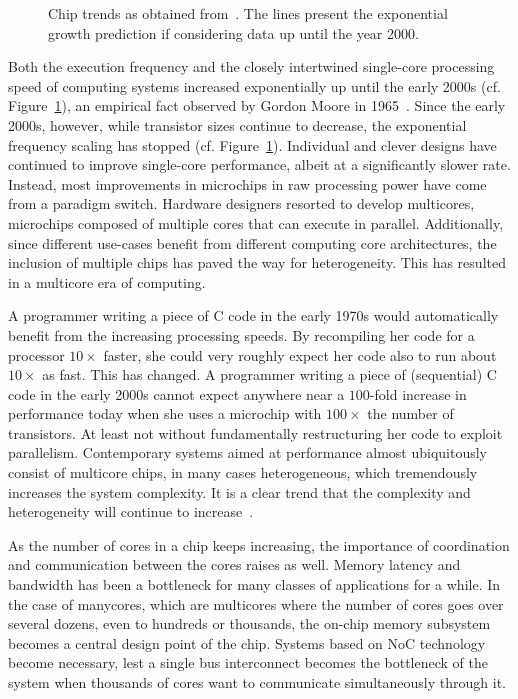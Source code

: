 \begin{figure}[h]
	\centering
   \resizebox{0.9\textwidth}{!}{}
   \caption{Chip trends as obtained from~\cite{microprocessordata}. The lines present the exponential growth prediction if considering data up until the year 2000.}
	\label{fig:multicore_era}
\end{figure}


Both the execution frequency and the closely intertwined single-core processing speed of computing systems increased exponentially up until the early 2000s (cf. Figure~\ref{fig:multicore_era}), an empirical fact observed by Gordon Moore in 1965~\cite{moore}.
Since the early 2000s, however, while transistor sizes continue to decrease, the exponential frequency scaling has stopped (cf. Figure~\ref{fig:multicore_era}).
Individual and clever designs have continued to improve single-core performance, albeit at a significantly slower rate.
Instead, most improvements in microchips in raw processing power have come from a paradigm switch.
Hardware designers resorted to develop multicores, microchips composed of multiple cores that can execute in parallel.
Additionally, since different use-cases benefit from different computing core architectures, the inclusion of multiple chips has paved the way for heterogeneity.
This has resulted in a multicore era of computing.

A programmer writing a piece of C code in the early 1970s would automatically benefit from the increasing processing speeds.
By recompiling her code for a processor $10 \times$ faster, she could very roughly expect her code also to run about $10 \times$ as fast. %
This has changed. A programmer writing a piece of (sequential) C code in the early 2000s cannot expect anywhere near a $100$-fold increase in performance today when she uses a microchip with $100 \times$ the number of transistors.
At least not without fundamentally restructuring her code to exploit parallelism.
Contemporary systems aimed at performance almost ubiquitously consist of multicore chips, in many cases heterogeneous, which tremendously increases the system complexity.
It is a clear trend that the complexity and heterogeneity will continue to increase~\cite{voelp16_pmes,castrillon_tmscs17}.

As the number of cores in a chip keeps increasing, the importance of coordination and communication between the cores raises as well.
Memory latency and bandwidth has been a bottleneck for many classes of applications for a while.
In the case of manycores, which are multicores where the number of cores goes over several dozens, even to hundreds or thousands, the on-chip memory subsystem becomes a central design point of the chip.
Systems based on \ac{NoC} technology become necessary, lest a single bus interconnect becomes the bottleneck of the system when thousands of cores want to communicate simultaneously through it.


